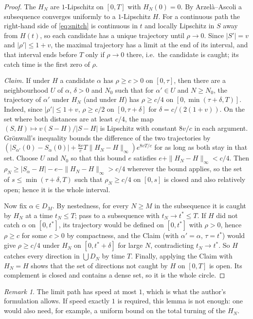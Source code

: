 \documentclass[11pt]{article}
\theoremstyle{remark}\newtheorem{remark}{Remark}
\begin{document}
\begin{proof}
The $H_N$ are $1$-Lipschitz on $[0,T]$ with $H_N(0)=0$. By Arzel\`a--Ascoli a subsequence converges uniformly to a
$1$-Lipschitz $H$. For a continuous path the right-hand side of \eqref{eq:snitch} is continuous in $t$ and locally Lipschitz in
$S$ away from $H(t)$, so each candidate has a unique trajectory until $\rho\to0$. Since $|S'|=v$ and $|\rho'|\le1+v$, the maximal trajectory has a limit at the end of its interval, and that interval ends before $T$ only if $\rho\to0$ there, i.e.\ the candidate is caught; its catch time is the first zero of $\rho$.

\emph{Claim.} If under $H$ a candidate $\alpha$ has $\rho\ge c>0$ on $[0,\tau]$, then there are a neighbourhood $U$ of $\alpha$,
$\delta>0$ and $N_0$ such that for $\alpha'\in U$ and $N\ge N_0$, the trajectory of $\alpha'$ under $H_N$ (and under $H$) has
$\rho\ge c/4$ on $[0,\min(\tau+\delta,T)]$.
Indeed, since $|\rho'|\le1+v$, $\rho\ge c/2$ on $[0,\tau+\delta]$ for $\delta=c/(2(1+v))$. On the set where both distances are at
least $c/4$, the map $(S,H)\mapsto v(S-H)/|S-H|$ is Lipschitz with constant $8v/c$ in each argument. Gr\"onwall's inequality
bounds the difference of the two trajectories by $(|S_{\alpha'}(0)-S_\alpha(0)|+\tfrac{8v}{c}T\|H_N-H\|_\infty)e^{8vT/c}$ for as
long as both stay in that set. Choose $U$ and $N_0$ so that this bound $e$ satisfies $e+\|H_N-H\|_\infty<c/4$. Then
$\rho_N\ge|S_\alpha-H|-e-\|H_N-H\|_\infty>c/4$ wherever the bound applies, so the set of $s\le\min(\tau+\delta,T)$ such that
$\rho_N\ge c/4$ on $[0,s]$ is closed and also relatively open; hence it is the whole interval.

Now fix $\alpha\in D_M$. By nestedness, for every $N\ge M$ in the subsequence it is caught by $H_N$ at a time $t_N\le T$; pass to a subsequence with $t_N\to t^*\le T$.
If $H$ did not catch $\alpha$ on $[0,t^*]$, its trajectory would be defined on $[0,t^*]$ with $\rho>0$, hence $\rho\ge c$ for some $c>0$ by compactness, and the Claim (with $\alpha'=\alpha$, $\tau=t^*$) would give $\rho\ge c/4$ under $H_N$ on
$[0,t^*+\delta]$ for large $N$, contradicting $t_N\to t^*$. So $H$ catches every direction in $\bigcup D_N$ by time $T$.
Finally, applying the Claim with $H_N=H$ shows that the set of directions not caught by $H$ on $[0,T]$ is open. Its complement
is closed and contains a dense set, so it is the whole circle.
\end{proof}
\begin{remark}
The limit path has speed at most $1$, which is what the author's formulation allows. If speed exactly $1$ is required,
this lemma is not enough: one would also need, for example, a uniform bound on the total turning of the $H_N$.
\end{remark}
\end{document}
